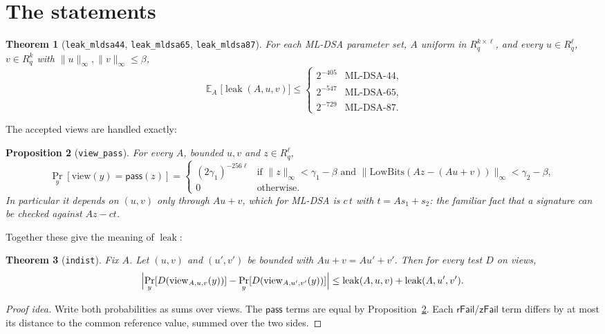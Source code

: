\documentclass[11pt]{article}
\newtheorem{theorem}{Theorem}
\newtheorem{proposition}[theorem]{Proposition}
\theoremstyle{definition}
\theoremstyle{remark}
\newcommand{\Rq}{R_q}
\newcommand{\E}{\mathop{\mathbb{E}}}
\newcommand{\leak}{\operatorname{leak}}
\newcommand{\lean}[1]{\texttt{#1}}
\renewcommand{\Pr}{\mathop{\mathrm{Pr}}}
\begin{document}
\section{The statements}

\begin{theorem}[\lean{leak\_mldsa44}, \lean{leak\_mldsa65}, \lean{leak\_mldsa87}]\label{thm:main}
For each ML-DSA parameter set, $A$ uniform in $\Rq^{k\times\ell}$, and every $u \in \Rq^\ell$,
$v \in \Rq^k$ with $\|u\|_\infty,\|v\|_\infty\le\beta$,
\[
  \E_A\bigl[\leak(A,u,v)\bigr] \le
  \begin{cases}
    2^{-405} & \text{ML-DSA-44},\\
    2^{-547} & \text{ML-DSA-65},\\
    2^{-729} & \text{ML-DSA-87}.
  \end{cases}
\]
\end{theorem}

The accepted views are handled exactly:

\begin{proposition}[\lean{view\_pass}]\label{prop:pass}
For every $A$, bounded $u,v$ and $z \in \Rq^\ell$,
\[
  \Pr_y[\mathrm{view}(y) = \mathsf{pass}(z)] =
  \begin{cases}
    (2\gamma_1)^{-256\ell} & \text{if } \|z\|_\infty < \gamma_1-\beta \text{ and }
       \|\mathrm{LowBits}(Az - (Au+v))\|_\infty < \gamma_2-\beta,\\
    0 & \text{otherwise.}
  \end{cases}
\]
In particular it depends on $(u,v)$ only through $Au+v$, which for ML-DSA is $c\,t$ with
$t = As_1+s_2$: the familiar fact that a signature can be checked against $Az - ct$.
\end{proposition}

Together these give the meaning of $\leak$:

\begin{theorem}[\lean{indist}]\label{thm:indist}
Fix $A$. Let $(u,v)$ and $(u',v')$ be bounded with $Au+v = Au'+v'$. Then for every test
$D$ on views,
\[
  \Bigl|\Pr_y[D(\mathrm{view}_{A,u,v}(y))] - \Pr_y[D(\mathrm{view}_{A,u',v'}(y))]\Bigr|
  \le \leak(A,u,v)+\leak(A,u',v').
\]
\end{theorem}

\begin{proof}[Proof idea]
Write both probabilities as sums over views. The $\mathsf{pass}$ terms are equal by
Proposition~\ref{prop:pass}. Each $\mathsf{rFail}$/$\mathsf{zFail}$ term differs by at most its
distance to the common reference value, summed over the two sides.
\end{proof}
\end{document}
